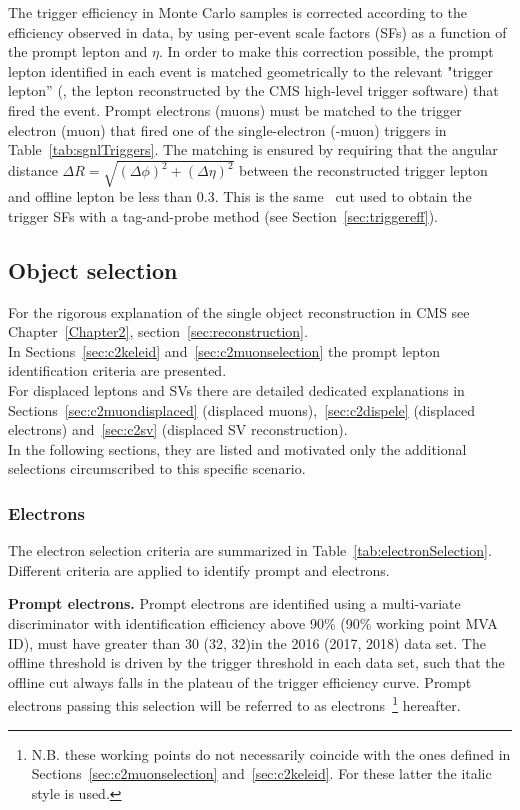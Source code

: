 The trigger efficiency in  Monte Carlo samples is corrected
according to the efficiency observed in data, by using per-event scale
factors (SFs) as a function of the prompt lepton \pt and $\eta$.
In order to make this correction possible, the prompt lepton
identified in each event is matched geometrically to the relevant
"trigger lepton'' (\ie, the lepton reconstructed by the CMS
high-level trigger software) that fired the event. Prompt electrons
(muons) must be matched to the trigger electron (muon) that fired one
of the single-electron (-muon) triggers in
Table~\ref{tab:sgnlTriggers}.
The matching is ensured by requiring that the angular distance
\(\Delta R=\sqrt{\left(\Delta\phi\right)^2+\left(\Delta\eta\right)^2}\) 
between the reconstructed trigger lepton and offline lepton be less
than 0.3. This is the same \DR\ cut used to obtain the trigger SFs
with a tag-and-probe method (see Section~\ref{sec:triggereff}).

\subsection{Object selection}\label{sec:llobject}
For the rigorous explanation of the single object reconstruction in
CMS see Chapter~\ref{Chapter2}, section~\ref{sec:reconstruction}.\\
In Sections~\ref{sec:c2keleid} and~\ref{sec:c2muonselection} the
prompt lepton identification criteria are presented.\\
For displaced
leptons and SVs there are detailed dedicated explanations in
Sections~\ref{sec:c2muondisplaced} (displaced
muons),~\ref{sec:c2dispele} (displaced electrons) and~\ref{sec:c2sv}
(displaced SV reconstruction).\\

In the following sections, they are listed and motivated only the
additional selections circumscribed
to this specific scenario.

\subsubsection{Electrons}\label{sec:llelectron}
The electron selection criteria are summarized in
Table~\ref{tab:electronSelection}. 
Different criteria are applied to identify prompt and \displ
electrons.

\textbf {Prompt electrons.}
Prompt electrons are identified using a multi-variate discriminator with identification efficiency above 90\%
(90\% working point MVA ID),
must have \pt greater than 30 (32, 32)\GeV in the 2016 (2017, 2018)
data set.
The offline \pt threshold is driven by the trigger \pt threshold in
each data set, such that the offline cut always falls in the plateau
of the trigger efficiency curve.
Prompt electrons passing this selection will be referred to as \tP electrons~\footnote{
N.B. these working points do not necessarily coincide with the ones
defined in Sections~\ref{sec:c2muonselection}
and~\ref{sec:c2keleid}. For these latter the italic style is used.} hereafter.

